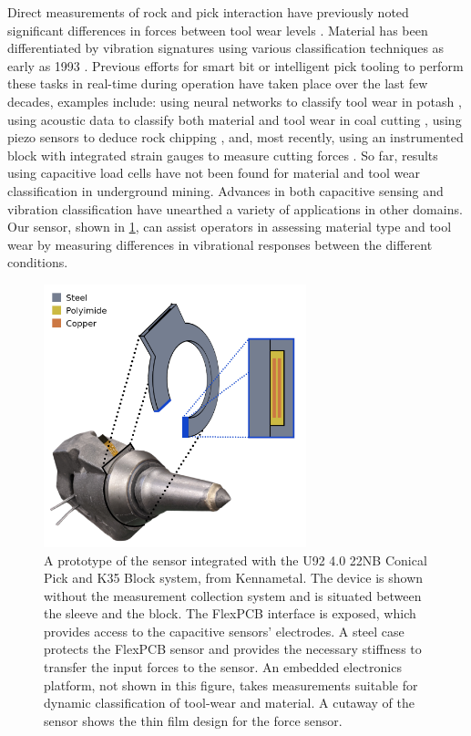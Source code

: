 Direct measurements of rock and pick interaction have previously noted 
 significant differences in forces between tool wear levels \cite{sundae85, donna90}.
Material has been differentiated by vibration signatures using various classification techniques
 as early as 1993 \cite{gary93}.
Previous efforts for smart bit or intelligent pick tooling to perform these tasks in real-time during operation 
 have taken place over the last few decades, examples include:
 using neural networks to classify tool wear in potash \cite{potashMeyersThesis}, 
 using acoustic data to classify both material and tool wear in coal cutting \cite{shen1996acoustic}, 
 using piezo sensors to deduce rock chipping \cite{smartbitMillerThesis},
 and, most recently, using an instrumented block with integrated strain gauges to measure cutting forces \cite{fries21}.
So far, results using capacitive load cells have not been found for 
 material and tool wear classification in underground mining. 
Advances in both capacitive sensing and vibration classification 
 have unearthed a variety of applications in other domains.
Our sensor, shown in \ref{fig:senseonpick}, can assist operators in assessing material type and tool wear
 by measuring differences in vibrational responses between the different conditions.


\begin{figure}[t!]
\centering
\includegraphics[width=3in]{figures/p1_media/Fig1.png}
\caption{A prototype of the sensor integrated with the U92 4.0 22NB  Conical Pick
 and K35 Block system, from Kennametal. The device is shown without the measurement
 collection system and is situated between the sleeve and the block.
The FlexPCB interface is exposed, which provides access to the capacitive sensors' electrodes.
 A steel case protects the FlexPCB sensor and
provides the necessary stiffness to transfer the input forces to the sensor.
An embedded electronics platform, not shown in this figure, takes measurements
 suitable for dynamic classification of tool-wear and material. 
A cutaway of the sensor shows the thin film design for the force sensor.}
\label{fig:senseonpick}
\end{figure}


